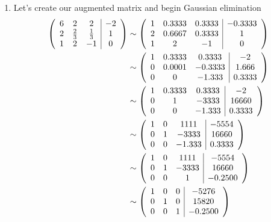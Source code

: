 \documentclass[a4paper,12pt]{article}
\begin{document}
\begin{enumerate}[label = \arabic*.]
\begin{enumerate}[label = (\alph*)]
			\item Let's create our augmented matrix and begin Gaussian elimination
			\begin{align*}
				\left(\begin{array}{c c c | c}
					6 & 2 & 2 & -2 \\
					2 & \frac{2}{3} & \frac{1}{3} & 1\\
					1 & 2 & -1 & 0
				\end{array}\right) 
				&\sim 
				\left(\begin{array}{c c c | c}
					1 & 0.3333 & 0.3333 & -0.3333 \\
					2 & 0.6667 & 0.3333 & 1 \\
					1 & 2 & -1 & 0
				\end{array}\right) \\
				&\sim
				\left(\begin{array}{c c c | c}
					1 & 0.3333 & 0.3333 & -2 \\
					0 & 0.0001 & -0.3333 & 1.666 \\
					0 & 0 & -1.333 & 0.3333
				\end{array}\right) \\ 
				&\sim
				\left(\begin{array}{c c c | c}
					1 & 0.3333 & 0.3333 & -2 \\
					0 & 1 & -3333 & 16660 \\
					0 & 0 & -1.333 & 0.3333
				\end{array}\right) \\ 
				&\sim
				\left(\begin{array}{c c c | c}
					1 & 0 & 1111 & -5554 \\
					0 & 1 & -3333 & 16660 \\
					0 & 0 & -1.333 & 0.3333
				\end{array}\right) \\ 
				&\sim
				\left(\begin{array}{c c c | c}
					1 & 0 & 1111 & -5554 \\
					0 & 1 & -3333 & 16660 \\
					0 & 0 & 1 & -0.2500
				\end{array}\right) \\ 
				&\sim
				\left(\begin{array}{c c c | c}
					1 & 0 & 0 & -5276 \\
					0 & 1 & 0 & 15820 \\
					0 & 0 & 1 & -0.2500
				\end{array}\right) 
			\end{align*}
	\end{enumerate}
\end{enumerate}
\end{document}
